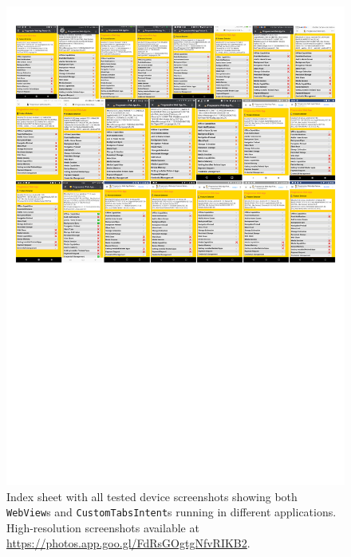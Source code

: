 \documentclass[sigconf]{acmart}
\begin{document}
\begin{figure}[b]
  \begin{center}
  \centerline{\includegraphics[trim=.5cm 13.75cm .5cm .5cm, clip]{index-sheet.pdf}}
  \caption{Index sheet with all tested device screenshots showing both \texttt{WebView}s
    and \texttt{CustomTabsIntent}s running in different applications.
    High-resolution screenshots available at \url{https://photos.app.goo.gl/FdRsGOgtgNfvRIKB2}.}
  \label{fig:indexsheet}
  \end{center}
\end{figure}



\end{document}
